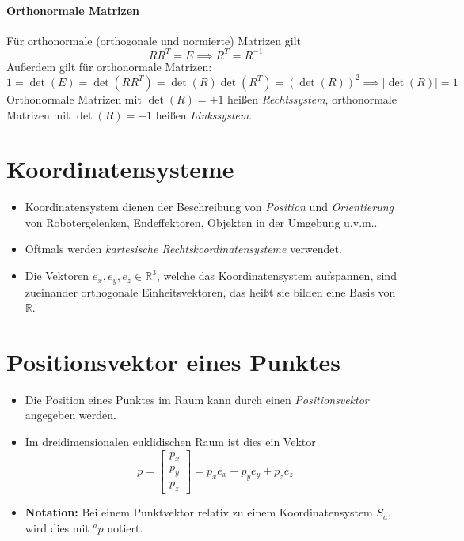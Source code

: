 \documentclass[a4paper, 11pt, accentcolor = tud3b]{tudreport}
\providecommand{\abs}[1]{\ensuremath{{\lvert #1 \rvert}}}
\begin{document}
	        \paragraph{Orthonormale Matrizen}
	        Für orthonormale (orthogonale und normierte) Matrizen gilt
	        \begin{equation*}
		        R R ^ T = E \implies R ^ T = R ^ { -1 }
	        \end{equation*}
	        Außerdem gilt für orthonormale Matrizen:
	        \begin{equation*}
		        1 = \det(E) = \det(R R ^ T) = \det(R) \det(R ^ T) = (\det(R)) ^ 2 \implies \abs{\det(R)} = 1
	        \end{equation*}
	        Orthonormale Matrizen mit \( \det(R) = +1 \) heißen \textit{Rechtssystem}, orthonormale Matrizen mit \( \det(R) = -1 \) heißen \textit{Linkssystem}.

        \section{Koordinatensysteme} %
	        \begin{itemize}
	        	\item Koordinatensystem dienen der Beschreibung von \textit{Position} und \textit{Orientierung} von Robotergelenken, Endeffektoren, Objekten in der Umgebung u.v.m..
	        	\item Oftmals werden \textit{kartesische Rechtskoordinatensysteme} verwendet.
	        	\item Die Vektoren \( e _ x, e _ y, e _ z \in \mathbb{R} ^ 3 \), welche das Koordinatensystem aufspannen, sind zueinander orthogonale Einheitsvektoren, das heißt sie bilden eine Basis von \( \mathbb{R} \).
	        \end{itemize}

        \section{Positionsvektor eines Punktes} %
            \begin{itemize}
            	\item Die Position eines Punktes im Raum kann durch einen \textit{Positionsvektor} angegeben werden.
            	\item Im dreidimensionalen euklidischen Raum ist dies ein Vektor
	            	\begin{equation*}
		            	p =
		            	\begin{bmatrix}
			            	p _ x \\
			            	p _ y \\
			            	p _ z
		            	\end{bmatrix}
		            	= p _ x e _ x + p _ y e _ y + p _ z e _ z
	            	\end{equation*}
	            \item \textbf{Notation:} Bei einem Punktvektor relativ zu einem Koordinatensystem \( S _ a \), wird dies mit \( ^a p \) notiert.
            \end{itemize}
\end{document}
